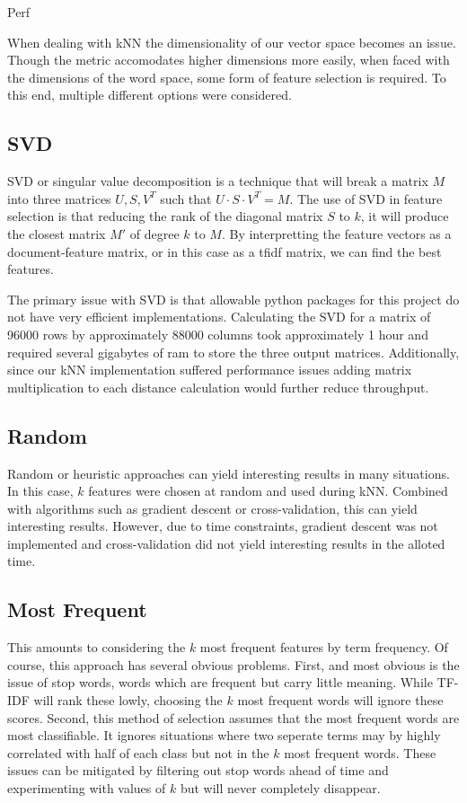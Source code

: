 \documentclass[10pt,twocolumn]{article}
\begin{document}
Perf

When dealing with kNN the dimensionality of our vector space becomes an issue. Though the metric accomodates higher dimensions more easily, when faced with the dimensions of the word space, some form of feature selection is required. To this end, multiple different options were considered.   

\subsection*{SVD}

SVD or singular value decomposition is a technique that will break a matrix $M$ into three matrices $U, S, V^T$ such that $U \cdot S \cdot V^T = M$. The use of SVD in feature selection is that reducing the rank of the diagonal matrix $S$ to $k$, it will produce the closest matrix $M'$ of degree $k$ to $M$. By interpretting the feature vectors as a document-feature matrix, or in this case as a tfidf matrix, we can find the best features. 

The primary issue with SVD is that allowable python packages for this project do not have very efficient implementations. Calculating the SVD for a matrix of 96000 rows by approximately 88000 columns took approximately 1 hour and required several gigabytes of ram to store the three output matrices. Additionally, since our kNN implementation suffered performance issues adding matrix multiplication to each distance calculation would further reduce throughput.

\subsection*{Random}

Random or heuristic approaches can yield interesting results in many situations. In this case, $k$ features were chosen at random and used during kNN. Combined with algorithms such as gradient descent or cross-validation, this can yield interesting results. However, due to time constraints, gradient descent was not implemented and cross-validation did not yield interesting results in the alloted time.

\subsection*{Most Frequent}

This amounts to considering the $k$ most frequent features by term frequency. Of course, this approach has several obvious problems. First, and most obvious is the issue of stop words, words which are frequent but carry little meaning. While TF-IDF will rank these lowly, choosing the $k$ most frequent words will ignore these scores. Second, this method of selection assumes that the most frequent words are most classifiable. It ignores situations where two seperate terms may by highly correlated with half of each class but not in the $k$ most frequent words. These issues can be mitigated by filtering out stop words ahead of time and experimenting with values of $k$ but will never completely disappear.
\end{document}
